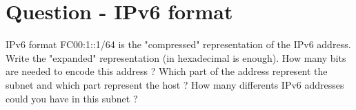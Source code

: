 \section{Question - IPv6 format}

\begin{questionBox}{ IPv6 format}
    FC00:1::1/64 is the "compressed" representation of the IPv6 address. Write the "expanded" representation (in hexadecimal is enough). How many bits are needed to encode this address ? Which part of the address represent the subnet and which part represent the host ? How many differents IPv6 addresses could you have in this subnet ?
\end{questionBox}
